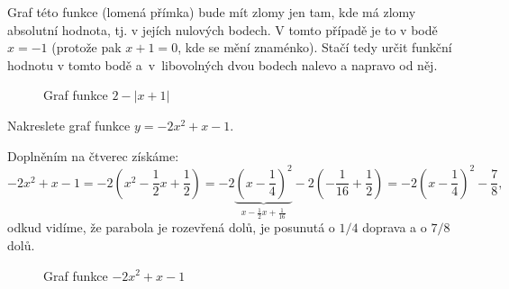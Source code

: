 \begin{reseni}
	Graf této funkce (lomená přímka) bude mít zlomy jen tam, kde má zlomy absolutní hodnota,
	tj. v jejích nulových bodech. V tomto případě je to v bodě $x=-1$
	(protože pak $x+1=0$, kde se mění znaménko). Stačí tedy určit funkční hodnotu v tomto bodě
	a~v~libovolných dvou bodech nalevo a napravo od něj.
	\begin{figure}[ht!]
        \begin{center}
        \caption{Graf funkce  $2- |x+1|$}
        \end{center}
        \end{figure}
\end{reseni}

\begin{priklad}
Nakreslete graf funkce $y=-2x^2+x-1$.
\end{priklad}

\begin{reseni}
Doplněním na čtverec získáme:
$$
	-2x^2+x-1 = -2 \left( x^2-\frac{1}{2}x+\frac{1}{2} \right ) = -2 \underbrace{\left( x-\frac{1}{4} \right )^2}_{x-\frac{1}{2}x+\frac{1}{16}} -2\left(-\frac{1}{16}+\frac{1}{2}\right)=-2 \left( x- \frac{1}{4} \right )^2-\frac{7}{8},
$$
odkud vidíme, že parabola je rozevřená dolů, je posunutá o $1/4$ doprava a o $7/8$ dolů.
\begin{figure}[ht!]
       \begin{center}
       \caption{Graf funkce $-2x^2+x-1$}
       \end{center}
       \end{figure}
\end{reseni}

